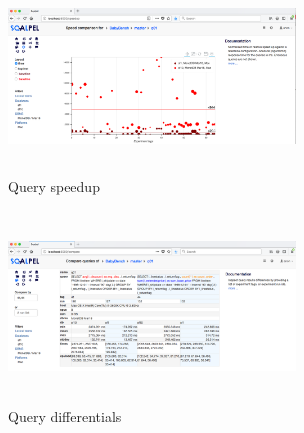 \documentclass{cidr-2019}
\begin{document}
\begin{figure}[t!]
\centering
\includegraphics[height=2in,width=3in]{Figures/speedup3.png}
\caption{Query speedup
	\label{fig:speedup2}}
\end{figure}

\begin{figure}[t!]
\centering
\includegraphics[height=2in,width=3in]{Figures/compare2.png}
\caption{Query differentials
	\label{fig:differential}}
\end{figure}










\end{document}
